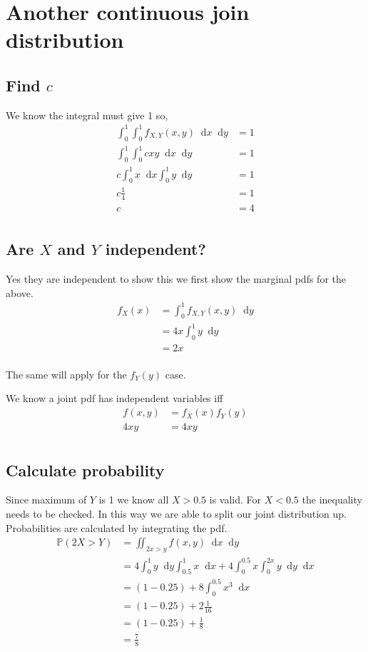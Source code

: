 \documentclass{article}
\newcommand{\diff}{\mathop{}\!\mathrm{d}}
\newcommand{\prob}{\mathbb{P}}
\begin{document}
\section{Another continuous join distribution}
\subsection{Find $c$}
We know the integral must give 1 so,
\begin{align*}
    \int_0^1 \int_0^1 f_{X,Y}(x,y) \diff x \diff y &= 1 \\
    \int_0^1 \int_0^1 cxy \diff x \diff y &= 1 \\
    c \int_0^1 x \diff x \int_0^1 y \diff y &= 1 \\
    c \frac{1}{4} &= 1 \\
    c &= 4 \\
\end{align*}

\subsection{Are $X$ and $Y$ independent?}
Yes they are independent to show this we first show the marginal pdfs
for the above.
\begin{align*}
    f_X(x) &= \int_0^1 f_{X,Y}(x,y) \diff y \\
    &= 4x\int_0^1 y \diff y \\
    &= 2x \\
\end{align*}

The same will apply for the $f_Y(y)$ case.

We know a joint pdf has independent variables iff
\begin{align*}
    f(x,y) &= f_X(x)f_Y(y) \\
    4xy &= 4xy \\
\end{align*}

\subsection{Calculate probability}
Since maximum of $Y$ is 1 we know all $X>0.5$ is valid. For $X<0.5$ the
inequality needs to be checked. In this way we are able to split our joint
distribution up. Probabilities are calculated by integrating the pdf.
\begin{align*}
    \prob(2X>Y) &= \iint_{2x>y} f(x,y) \diff x \diff y \\
    &= 4 \int_0^1 y \diff y \int_{0.5}^1 x \diff x
    + 4 \int_0^{0.5} x \int_0^{2x} y \diff y \diff x \\
    &= (1 - 0.25) + 8 \int_0^{0.5} x^3 \diff x \\
    &= (1 - 0.25) + 2 \frac{1}{16} \\
    &= (1 - 0.25) + \frac{1}{8} \\
    &= \frac{7}{8} \\
\end{align*}
\end{document}
